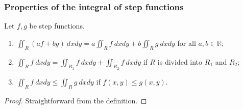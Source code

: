 \documentclass[aspectratio=169,handout]{beamer}
\newcommand{\bR}{\mathbb{R}} %
\begin{document}
\begin{frame}
    \frametitle{Properties of the integral of step functions}

    \begin{theorem}
        Let \(f,g\) be step functions.
        \begin{enumerate}
            \item \(\displaystyle \iint_{R} (a f + b g) \ dxdy = a \displaystyle \iint_{R} f \ dxdy + b \displaystyle\iint_{R} g \ dxdy\) for all \(a,b\in \bR\);
            \item \(\displaystyle\iint_{R} f \ dxdy =  \displaystyle\iint_{R_1} f \ dxdy + \displaystyle \iint_{R_2} f \ dxdy\) if \(R\) is divided into \(R_1\) and \(R_2\);
            \item \(\displaystyle\iint_{R} f \ dxdy \leq \displaystyle \iint_{R} g \ dxdy\) if \(f(x,y) \leq g(x,y)\).
        \end{enumerate}
    \end{theorem}

    \begin{proof}
        Straightforward from the definition.
    \end{proof}


\end{frame}


\end{document}
